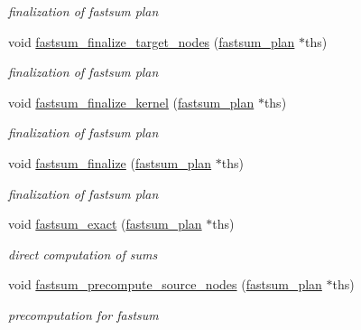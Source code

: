 \begin{DoxyCompactItemize}
\begin{DoxyCompactList}\small\item\em finalization of fastsum plan \end{DoxyCompactList}\item 
void \hyperlink{group__applications__fastsum_ga4353da818ef825ca6718a6c269c6ec16}{fastsum\-\_\-finalize\-\_\-target\-\_\-nodes} (\hyperlink{group__applications__fastsum_gad953252f6b309404991c4afc7b98b34b}{fastsum\-\_\-plan} $\ast$ths)
\begin{DoxyCompactList}\small\item\em finalization of fastsum plan \end{DoxyCompactList}\item 
void \hyperlink{group__applications__fastsum_gab315229b38f44544cc01583608ac12df}{fastsum\-\_\-finalize\-\_\-kernel} (\hyperlink{group__applications__fastsum_gad953252f6b309404991c4afc7b98b34b}{fastsum\-\_\-plan} $\ast$ths)
\begin{DoxyCompactList}\small\item\em finalization of fastsum plan \end{DoxyCompactList}\item 
void \hyperlink{group__applications__fastsum_gab989ea4659fe681bd4c025e82756f769}{fastsum\-\_\-finalize} (\hyperlink{group__applications__fastsum_gad953252f6b309404991c4afc7b98b34b}{fastsum\-\_\-plan} $\ast$ths)
\begin{DoxyCompactList}\small\item\em finalization of fastsum plan \end{DoxyCompactList}\item 
void \hyperlink{group__applications__fastsum_gaaee3dd954ffc99e4330fabe16ccad0fd}{fastsum\-\_\-exact} (\hyperlink{group__applications__fastsum_gad953252f6b309404991c4afc7b98b34b}{fastsum\-\_\-plan} $\ast$ths)
\begin{DoxyCompactList}\small\item\em direct computation of sums \end{DoxyCompactList}\item 
void \hyperlink{group__applications__fastsum_gaa0f96f9bbfbdf846b31f2bd31a0fe663}{fastsum\-\_\-precompute\-\_\-source\-\_\-nodes} (\hyperlink{group__applications__fastsum_gad953252f6b309404991c4afc7b98b34b}{fastsum\-\_\-plan} $\ast$ths)
\begin{DoxyCompactList}\small\item\em precomputation for fastsum \end{DoxyCompactList}\item 

\end{DoxyCompactItemize}
